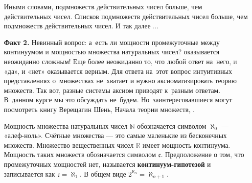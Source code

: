 \documentclass[pdftex, 12pt, a4paper]{article}
\def \mbb{\mathbb}
\def \RR{\mbb R}
\def \NN{\mbb N}
\def \a{\alpha}
\theoremstyle{definition} %
\numberwithin{problem}{section}
\newcommand{\indef}[1]{\textbf{#1}}
\numberwithin{blits}{section}
\begin{document}
Иными словами, подмножеств действительных чисел больше, чем действительных чисел. Списков подмножеств действительных чисел больше, чем подмножеств действительных чисел. И так далее $\dots$

\begin{center}
\end{center}

\textbf{Факт 2.} Невинный вопрос: а~есть ли мощности промежуточные между континуумом и мощностью множества натуральных чисел? оказывается неожиданно сложным! Еще более неожиданно то, что любой ответ на~него, и «да», и «нет» оказывается верным. Для ответа на~этот вопрос интуитивных представлениях о~множествах не~хватает и нужно аксиоматизировать теорию множеств. Так вот, разные системы аксиом приводят к~разным ответам. В~данном курсе мы это обсуждать не~будем. Но~заинтересовавшиеся могут посмотреть книгу Верещагин Шень, Начала теории множеств, \cite{Shan:sets}.

Мощность множества натуральных чисел $\NN$ обозначается символом $\aleph_0$ --- «алеф-ноль». Счётные множества --- это самые маленькие из бесконечных множеств. Множество вещественных чисел $\RR$ имеет мощность континуума. Мощность таких множеств обозначается символом  $\mathfrak{c}$. Предположение о том, что промежуточных мощностей нет, называется \indef{континуум-гипотезой}  и записывается как $\mathfrak{c}=\aleph_1$. В общем виде $2^{\aleph_{\a}} = \aleph_{\a+1}$.
\end{document}
